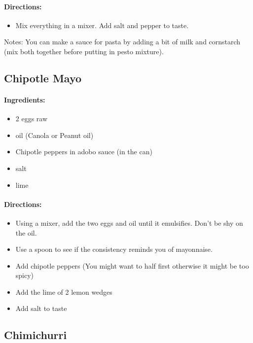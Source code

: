 \documentclass{article}
\begin{document}
\paragraph{Directions:}
\begin{itemize}
	\item Mix everything in a mixer. Add salt and pepper to taste.
\end{itemize}

Notes: You can make a sauce for pasta by adding a bit of milk and cornstarch (mix both together before putting in pesto mixture).

\subsection{Chipotle Mayo}

\paragraph{Ingredients:}

\begin{itemize}
	\item 2 eggs raw
	\item oil (Canola or Peanut oil)
	\item Chipotle peppers in adobo sauce (in the can)
	\item salt
	\item lime
\end{itemize}

\paragraph{Directions:}
\begin{itemize}
	\item Using a mixer, add the two eggs and oil until it emulsifies. Don't be shy on the oil.
	\item Use a spoon to see if the consistency reminds you of mayonnaise.
	\item Add chipotle peppers (You might want to half first otherwise it might be too spicy)
	\item Add the lime of 2 lemon wedges
	\item Add salt to taste
\end{itemize}

\subsection{Chimichurri}
\end{document}
